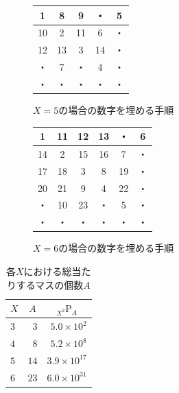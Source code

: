 \begin{figure}
\begin{minipage}{0.5\hsize}
\begin{center}\begin{tabular}{|c|c|c|c|c|}\hline
1&8&9&・&5 \\\hline
10&2&11&6&・ \\\hline
12&13&3&14&・ \\\hline
・&7&・&4&・ \\\hline
・&・&・&・&・ \\\hline
\end{tabular}\end{center}
\caption{$X=5$の場合の数字を埋める手順}
\label{pic:prog3-orderofchain5}
\end{minipage}
\begin{minipage}{0.5\hsize}
\begin{center}\begin{tabular}{|c|c|c|c|c|c|}\hline
1&11&12&13& ・ &6 \\\hline
14&2&15&16&7& ・ \\\hline
17&18&3&8&19& ・ \\\hline
20&21&9&4&22& ・ \\\hline
・&10&23& ・ &5& ・ \\\hline
 ・ & ・ & ・ & ・ & ・ & ・ \\\hline
\end{tabular}\end{center}
\caption{$X=6$の場合の数字を埋める手順}
\label{pic:prog3-orderofchain6}
\end{minipage}
\end{figure}



\begin{table}[htb]
	\begin{center}
	\begin{tabular}{|l|r|r|}
\hline \hline
\multicolumn{1}{|c|}{$X$} & \multicolumn{1}{|c|}{$A$} & \multicolumn{1}{|c|}{$_{X^2} \mathrm{P} _A$} \\
\hline \hline
$3$ & $3$ & $5.0 \times 10^2$ \\
$4$ & $8$ & $5.2 \times 10^8$ \\
$5$ & $14$ & $3.9 \times 10^{17}$ \\
$6$ & $23$ & $6.0 \times 10^{31}$ \\
\hline
	\end{tabular}
	\end{center}
	\caption{各$X$における総当たりするマスの個数$A$}
	\label{tab:chaincount-each-X}
\end{table}

